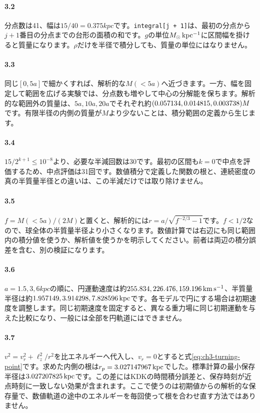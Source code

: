 \paragraph{3.2}
分点数は41、幅は$15/40=0.375\unit{kpc}$です。\texttt{integral[j + 1]}は、最初の分点から$j+1$番目の分点までの台形の面積の和です。$g$の単位$M_\odot\,\mathrm{kpc^{-1}}$に区間幅を掛けると質量になります。$\rho$だけを半径で積分しても、質量の単位にはなりません。

\paragraph{3.3}
同じ$[0,5a]$で細かくすれば、解析的な$M(<5a)$へ近づきます。一方、幅を固定して範囲を広げる実験では、分点数も増やして中心の分解能を保ちます。解析的な範囲外の質量は、$5a,10a,20a$でそれぞれ約$(0.057134,0.014815,0.003738)M$です。有限半径の内側の質量が$M$より少ないことは、積分範囲の定義から生じます。

\paragraph{3.4}
$15/2^{k+1}\leq10^{-8}$より、必要な半減回数は30です。最初の区間も$k=0$で中点を評価するため、中点評価は31回です。数値積分で定義した関数の根と、連続密度の真の半質量半径との違いは、この半減だけでは取り除けません。

\paragraph{3.5}
$f=M(<5a)/(2M)$と置くと、解析的には$r=a/\sqrt{f^{-2/3}-1}$です。$f<1/2$なので、球全体の半質量半径より小さくなります。数値計算では右辺にも同じ範囲内の積分値を使うか、解析値を使うかを明示してください。前者は両辺の積分誤差を含む、別の検証になります。

\paragraph{3.6}
$a=1.5,3,6\unit{kpc}$の順に、円運動速度は約$255.834,226.476,159.196\,\mathrm{km\,s^{-1}}$、半質量半径は約$1.957149,3.914298,7.828596\,\mathrm{kpc}$です。各モデルで円にする場合は初期速度を調整します。同じ初期速度を固定すると、異なる重力場に同じ初期運動を与えた比較になり、一般には全部を円軌道にはできません。

\paragraph{3.7}
$v^2=v_r^2+\ell_z^2/r^2$を比エネルギーへ代入し、$v_r=0$とすると式\eqref{eq:ch3-turning-point}です。求めた内側の根は$r_p=3.027147967\,\mathrm{kpc}$でした。標準計算の最小保存半径は$3.027207825\,\mathrm{kpc}$です。この差にはKDKの時間積分誤差と、保存時刻が近点時刻に一致しない効果が含まれます。ここで使うのは初期値からの解析的な保存量で、数値軌道の途中のエネルギーを毎回使って根を合わせ直す方法ではありません。

